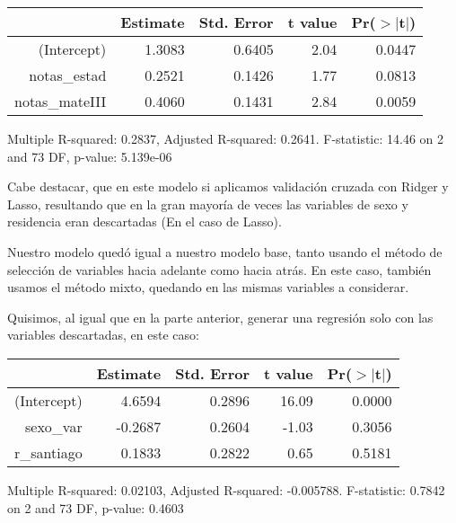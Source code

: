 \documentclass[11pt]{article}
\begin{document}
\begin{center}
\begin{table}[ht]
\begin{center}
\begin{tabular}{rrrrr}
  \hline
 & Estimate & Std. Error & t value & Pr($>$$|$t$|$) \\ 
  \hline
(Intercept) & 1.3083 & 0.6405 & 2.04 & 0.0447 \\ 
  notas\_estad & 0.2521 & 0.1426 & 1.77 & 0.0813 \\ 
  notas\_mateIII & 0.4060 & 0.1431 & 2.84 & 0.0059 \\ 
   \hline
\end{tabular}
\end{center}
\end{table}

\tiny{Multiple R-squared: 0.2837, Adjusted R-squared: 0.2641.
F-statistic: 14.46 on 2 and 73 DF, p-value: 5.139e-06}
\end{center}

Cabe destacar, que en este modelo si aplicamos validación cruzada con Ridger y Lasso, resultando que en la gran mayoría de veces las variables de sexo y residencia eran descartadas (En el caso de Lasso).

Nuestro modelo quedó igual a nuestro modelo base, tanto usando el método de selección de variables hacia adelante como hacia atrás. En este caso, también usamos el método mixto, quedando en las mismas variables a considerar.

Quisimos, al igual que en la parte anterior, generar una regresión solo con las variables descartadas, en este caso:

\begin{center}
\begin{table}[ht]
\centering
\begin{tabular}{rrrrr}
  \hline
 & Estimate & Std. Error & t value & Pr($>$$|$t$|$) \\ 
  \hline
(Intercept) & 4.6594 & 0.2896 & 16.09 & 0.0000 \\ 
  sexo\_var & -0.2687 & 0.2604 & -1.03 & 0.3056 \\ 
  r\_santiago & 0.1833 & 0.2822 & 0.65 & 0.5181 \\ 
   \hline
\end{tabular}
\end{table}
\tiny{Multiple R-squared: 0.02103, Adjusted R-squared: -0.005788.
F-statistic: 0.7842 on 2 and 73 DF, p-value: 0.4603}
\end{center}
\end{document}
